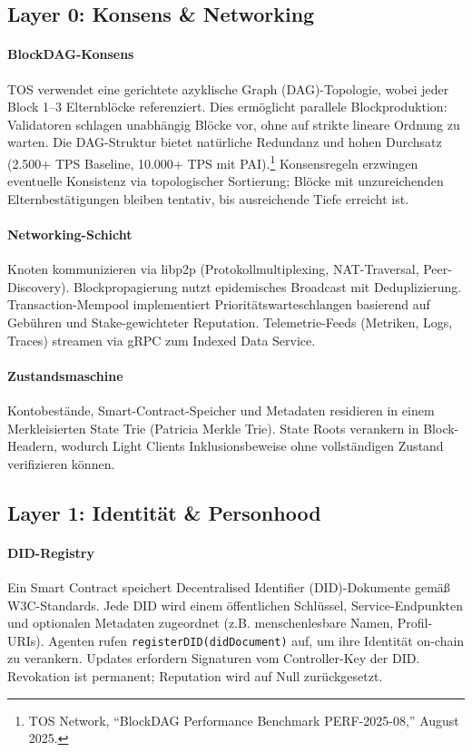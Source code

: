 \documentclass[11pt]{article}
\begin{document}
\subsection{Layer 0: Konsens \& Networking}
\paragraph{BlockDAG-Konsens} TOS verwendet eine gerichtete azyklische Graph (DAG)-Topologie, wobei jeder Block 1--3 Elternblöcke referenziert. Dies ermöglicht parallele Blockproduktion: Validatoren schlagen unabhängig Blöcke vor, ohne auf strikte lineare Ordnung zu warten. Die DAG-Struktur bietet natürliche Redundanz und hohen Durchsatz (2.500+ TPS Baseline, 10.000+ TPS mit PAI).\footnote{TOS Network, ``BlockDAG Performance Benchmark PERF-2025-08,'' August 2025.} Konsensregeln erzwingen eventuelle Konsistenz via topologischer Sortierung; Blöcke mit unzureichenden Elternbestätigungen bleiben tentativ, bis ausreichende Tiefe erreicht ist.

\paragraph{Networking-Schicht} Knoten kommunizieren via libp2p (Protokollmultiplexing, NAT-Traversal, Peer-Discovery). Blockpropagierung nutzt epidemisches Broadcast mit Deduplizierung. Transaction-Mempool implementiert Prioritätswarteschlangen basierend auf Gebühren und Stake-gewichteter Reputation. Telemetrie-Feeds (Metriken, Logs, Traces) streamen via gRPC zum Indexed Data Service.

\paragraph{Zustandsmaschine} Kontobestände, Smart-Contract-Speicher und Metadaten residieren in einem Merkleisierten State Trie (Patricia Merkle Trie). State Roots verankern in Block-Headern, wodurch Light Clients Inklusionsbeweise ohne vollständigen Zustand verifizieren können.

\subsection{Layer 1: Identität \& Personhood}
\paragraph{DID-Registry} Ein Smart Contract speichert Decentralised Identifier (DID)-Dokumente gemäß W3C-Standards. Jede DID wird einem öffentlichen Schlüssel, Service-Endpunkten und optionalen Metadaten zugeordnet (z.B. menschenlesbare Namen, Profil-URIs). Agenten rufen \texttt{registerDID(didDocument)} auf, um ihre Identität on-chain zu verankern. Updates erfordern Signaturen vom Controller-Key der DID. Revokation ist permanent; Reputation wird auf Null zurückgesetzt.
\end{document}
